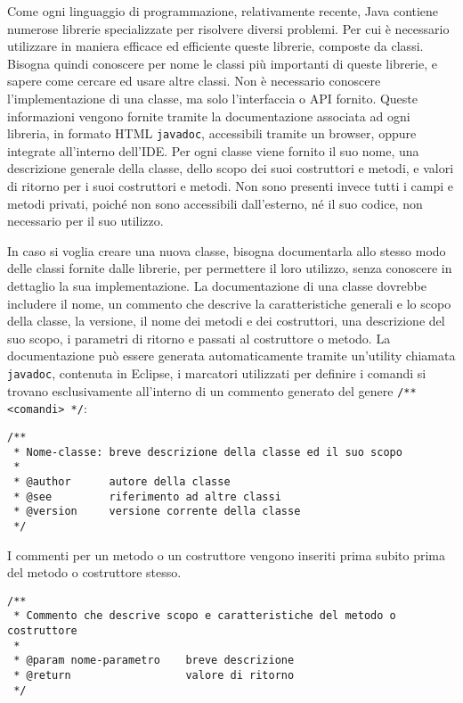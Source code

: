 \documentclass{article}
\numberwithin{equation}{subsection}
\begin{document}
Come ogni linguaggio di programmazione, relativamente recente, Java contiene numerose librerie specializzate per risolvere diversi problemi. Per cui è necessario utilizzare in 
maniera efficace ed efficiente queste librerie, composte da classi. Bisogna quindi conoscere per nome le classi più importanti di queste librerie, e sapere come cercare ed usare 
altre classi. 
Non è necessario conoscere l'implementazione di una classe, ma solo l'interfaccia o API fornito. Queste informazioni vengono fornite tramite la documentazione associata ad ogni 
libreria, in formato HTML \verb|javadoc|, accessibili tramite un browser, oppure integrate all'interno dell'IDE. 
Per ogni classe viene fornito il suo nome, una descrizione generale della classe, dello scopo dei suoi costruttori e metodi, e valori di ritorno per i suoi costruttori e metodi. 
Non sono presenti invece tutti i campi e metodi privati, poiché non sono accessibili dall'esterno, né il suo codice, non necessario per il suo utilizzo. 

In caso si voglia creare una nuova classe, bisogna documentarla allo stesso modo delle classi fornite dalle librerie, per permettere il loro utilizzo, senza conoscere in 
dettaglio la sua implementazione. La documentazione di una classe dovrebbe includere il nome, un commento che descrive la caratteristiche generali e lo scopo della classe, la versione, 
il nome dei metodi e dei costruttori, una descrizione del suo scopo, i parametri di ritorno e passati al costruttore o metodo. 
La documentazione può essere generata automaticamente tramite un'utility chiamata \verb|javadoc|, contenuta in Eclipse, i marcatori utilizzati per definire i comandi si trovano 
esclusivamente all'interno  di un commento generato del genere \verb|/** <comandi> */|:
\begin{verbatim}
/**
 * Nome-classe: breve descrizione della classe ed il suo scopo
 * 
 * @author      autore della classe
 * @see         riferimento ad altre classi
 * @version     versione corrente della classe
 */  
\end{verbatim}

I commenti per un metodo o un costruttore vengono inseriti prima subito prima del metodo o costruttore stesso. 
\begin{verbatim}
/**
 * Commento che descrive scopo e caratteristiche del metodo o costruttore
 * 
 * @param nome-parametro    breve descrizione
 * @return                  valore di ritorno
 */
\end{verbatim}
\end{document}
